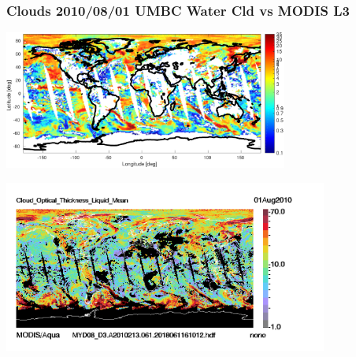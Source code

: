 \documentclass[10pt,t]{beamer}
\begin{document}
\begin{frame}
  \frametitle{Clouds 2010/08/01 UMBC Water Cld vs MODIS L3}

\vspace{-0.15in}  
  \begin{center}
    \noindent\includegraphics[width=0.7\textwidth]{Figs/FigsCO/water_cld_od_long.pdf}  
  \end{center}

\vspace{-0.15in}  
  \begin{center}
    \noindent\includegraphics[width=0.8\textwidth]{Figs/FigsCO/Cloud_Optical_Thickness_Liquid_Mean.png}  
  \end{center}

\end{frame}

\end{document}
